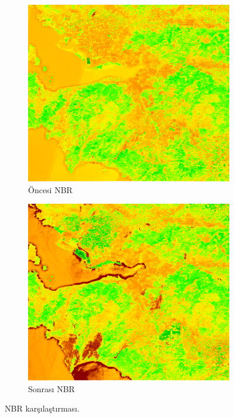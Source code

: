 \documentclass[11pt,a4paper]{article}
\begin{document}
\begin{figure}[H]
  \centering
  \begin{subfigure}[b]{0.48\textwidth}
    \centering
    \includegraphics[width=\textwidth]{../results/pre_NBR.png}
    \caption{Öncesi NBR}
  \end{subfigure}\hfill
  \begin{subfigure}[b]{0.48\textwidth}
    \centering
    \includegraphics[width=\textwidth]{../results/post_NBR.png}
    \caption{Sonrası NBR}
  \end{subfigure}
  \caption{NBR karşılaştırması.}
\end{figure}
\FloatBarrier
\end{document}

